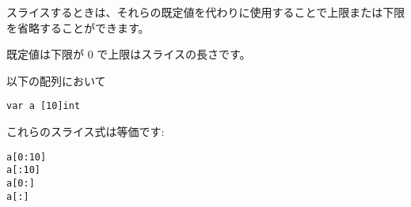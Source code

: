スライスするときは、それらの既定値を代わりに使用することで上限または下限を省略することができます。

既定値は下限が 0 で上限はスライスの長さです。

以下の配列において

\begin{lstlisting}[numbers=none]
var a [10]int
\end{lstlisting}

これらのスライス式は等価です:

\begin{lstlisting}[numbers=none]
a[0:10]
a[:10]
a[0:]
a[:]
\end{lstlisting}
